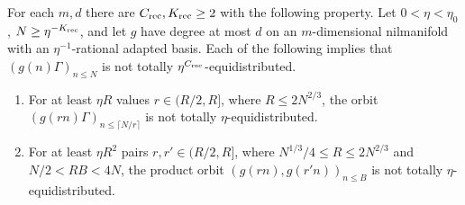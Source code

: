 \begin{lemma}\label{gi-recombination}
For each $m,d$ there are $C_{\rm rec},K_{\rm rec}\geq2$ with the following
property.  Let $0<\eta<\eta_0$, $N\geq\eta^{-K_{\rm rec}}$, and let $g$
have degree at most $d$ on an $m$-dimensional nilmanifold with an
$\eta^{-1}$-rational adapted basis.  Each of the following implies that
$(g(n)\Gamma)_{n\leq N}$ is not totally $\eta^{C_{\rm rec}}$-equidistributed.
\begin{enumerate}
\item For at least $\eta R$ values $r\in(R/2,R]$, where
$R\leq2N^{2/3}$, the orbit $(g(rn)\Gamma)_{n\leq\lceil N/r\rceil}$
is not totally $\eta$-equidistributed.
\item For at least $\eta R^2$ pairs $r,r'\in(R/2,R]$, where
$N^{1/3}/4\leq R\leq2N^{2/3}$ and $N/2<RB<4N$, the product orbit
$(g(rn),g(r'n))_{n\leq B}$ is not totally $\eta$-equidistributed.
\end{enumerate}
\end{lemma}
